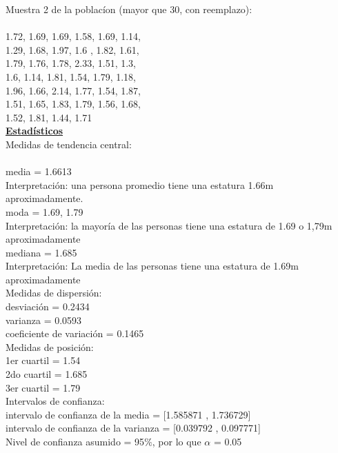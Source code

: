 \documentclass[a4paper,12pt]{article}
\begin{document}
\begin{enumerate}
Muestra 2 de la poblac\'ion (mayor que 30, con reemplazo): \\\\
1.72,	1.69,	1.69,	1.58,	1.69,	1.14,\\
1.29,	1.68,	1.97,	1.6	,   1.82,	1.61,\\
1.79,	1.76,	1.78,	2.33,	1.51,	1.3,\\
1.6,    1.14,	1.81,	1.54,	1.79,	1.18,\\
1.96,	1.66,	2.14,	1.77,	1.54,	1.87,\\
1.51,	1.65,	1.83,	1.79,	1.56,	1.68,\\
1.52,	1.81,	1.44,	1.71\\

\textbf{\underline{Estad\'isticos}} \\

Medidas de tendencia central:\\\\
media = 1.6613\\
Interpretaci\'on: una persona promedio tiene una estatura 1.66m aproximadamente.\\
moda = 1.69, 1.79\\
Interpretaci\'on: la mayor\'ia de las personas tiene una estatura de 1.69 o 1,79m aproximadamente\\
mediana = 1.685\\
Interpretación: La media de las personas tiene una estatura de 1.69m aproximadamente\\

Medidas de dispersi\'on:\\
desviaci\'on = 0.2434\\
varianza = 0.0593\\
coeficiente de variaci\'on = 0.1465\\

Medidas de posici\'on:\\
1er cuartil = 1.54\\
2do cuartil = 1.685\\
3er cuartil = 1.79\\

Intervalos de confianza:\\
intervalo de confianza de la media = [1.585871 ,  1.736729]\\
intervalo de confianza de la varianza = [0.039792 ,  0.097771]\\
Nivel de confianza asumido = 95$\%$, por lo que $\alpha$ = 0.05\\\\


\end{enumerate}
\end{document}
